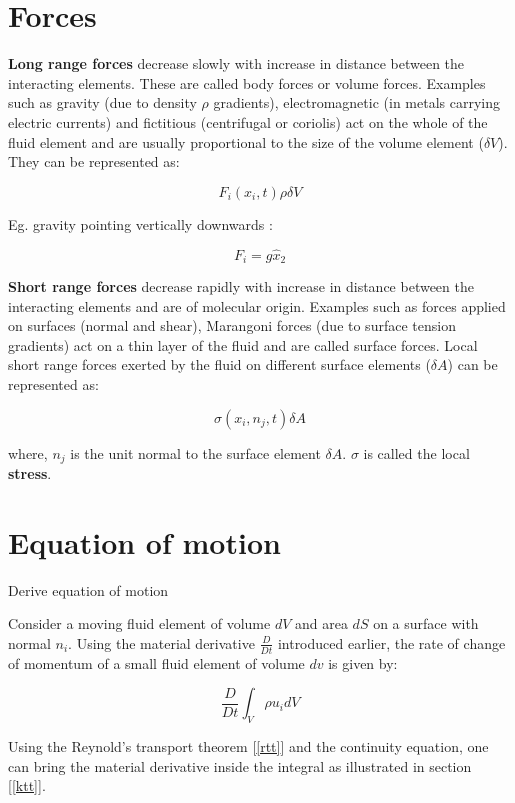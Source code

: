 \section{Forces}

{\bf Long range forces} decrease slowly with increase in distance between the interacting elements. These are called body forces or volume forces. Examples such as gravity (due to density $\rho$ gradients), electromagnetic (in metals carrying electric currents) and fictitious (centrifugal or coriolis) act on the whole of the fluid element and are usually proportional to the size of the volume element ($\delta V$). They can be represented as:

$$ F_i(x_i,t) \rho \delta V $$

Eg. gravity pointing vertically downwards :

$$ F_i = g \hat{x}_2 $$

{\bf Short range forces} decrease rapidly with increase in distance between the interacting elements and are of molecular origin. Examples such as forces applied on surfaces (normal and shear), Marangoni forces (due to surface tension gradients) act on a thin layer of the fluid and are called surface forces. Local short range forces exerted by the fluid on different surface elements ($\delta A$) can be represented as:

$$ \sigma(x_i, n_j, t) \delta A $$

where, $n_j$ is the unit normal to the surface element $\delta A$. $\sigma$ is called the local {\bf stress}.

\section{Equation of motion}

\begin {lo3} 
Derive equation of motion
\end {lo3}

Consider a moving fluid element of volume $dV$ and area $dS$ on a surface with normal $n_i$. Using the material derivative $\frac{D}{Dt}$ introduced earlier, the rate of change of momentum of a small fluid element of volume $dv$ is given by:

$$ \frac{D}{Dt} \int_{V}{\rho u_i dV} $$

Using the Reynold's transport theorem  [\ref{rtt}] and the continuity equation, one can bring the material derivative inside the integral as illustrated in section [\ref{ktt}]. 

